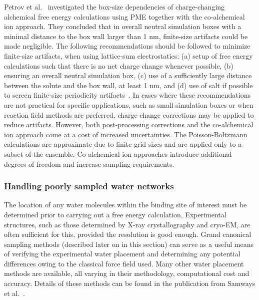 \documentclass[9pt,bestpractices]{livecoms}
\begin{document}
Petrov et al.~\cite{Petrov2024guidelines} investigated the box-size dependencies of charge-changing alchemical free energy calculations using PME together with the co-alchemical ion approach. They concluded that in overall neutral simulation boxes with a minimal distance to the box wall larger than 1 nm, finite-size artifacts could be made negligible. The following recommendations should be followed to minimize finite-size artifacts, when using lattice-sum electrostatics: (a) setup of free energy calculations such that there is no net charge change whenever possible, (b) ensuring an overall neutral simulation box, (c) use of a sufficiently large distance between the solute and the box wall, at least 1 nm, and (d) use of salt if possible to screen finite-size periodicity artifacts~\cite{chen2018accurate}. In cases where these recommendations are not practical for specific applications, such as small simulation boxes or when reaction field methods are preferred, charge-change corrections may be applied to reduce artifacts. However, both post-processing corrections and the co-alchemical ion approach come at a cost of increased uncertainties. The Poisson-Boltzmann calculations are approximate due to finite-grid sizes and are applied only to a subset of the ensemble. Co-alchemical ion approaches introduce additional degrees of freedom and increase sampling requirements.

\subsubsection{Handling poorly sampled water networks}
\label{sec:water_sampling}
The location of any water molecules within the binding site of interest must be determined prior to carrying out a free energy calculation. Experimental structures, such as those determined by X-ray crystallography and cryo-EM, are often sufficient for this, provided the resolution is good enough. Grand canonical sampling methods\cite{melling2023enhanced, samways2020grand} (described later on in this section) can serve as a useful means of verifying the experimental water placement and determining any potential differences owing to the classical force field used. Many other water placement methods are available, all varying in their methodology, computational cost and accuracy. Details of these methods can be found in the publication from Samways et al.~\cite{samways2021water}.
\end{document}
